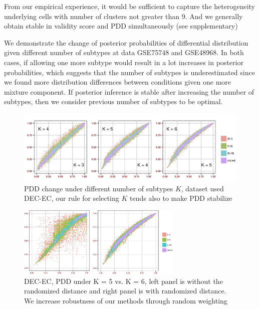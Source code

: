 \documentclass[aoas,preprint]{imsart}
\begin{document}
From our empirical experience, it would be sufficient to capture the heterogeneity underlying cells with number of clusters not greater than 9.  And we generally obtain stable in validity score and PDD simultaneously (see supplementary)


We demonstrate the change of posterior probabilities of differential distribution given different number of subtypes at data GSE75748 and GSE48968. In both cases, if allowing one more subtype would result in a lot increases in posterior probabilities, which suggests that the number of subtypes is underestimated since we found more distribution differences between conditions given one more mixture component. If posterior inference is stable after increasing the number of subtypes, then we consider previous number of subtypes to be optimal.



\begin{figure}[h]
\includegraphics[width = 1\textwidth]{Figs/Kchange.png}
\caption{PDD change under different number of subtypes $K$, dataset used DEC-EC, our rule for selecting $K$ tends also to make PDD stabilize}
\end{figure}


\begin{figure}[h]
\includegraphics[width = 0.7\textwidth]{Figs/rw.pdf}
\caption{DEC-EC, PDD under K = 5 vs. K = 6, left panel is without the randomized distance and right panel is with randomized distance. We increase robustness of our methods through random weighting}
\end{figure}


\end{document}
